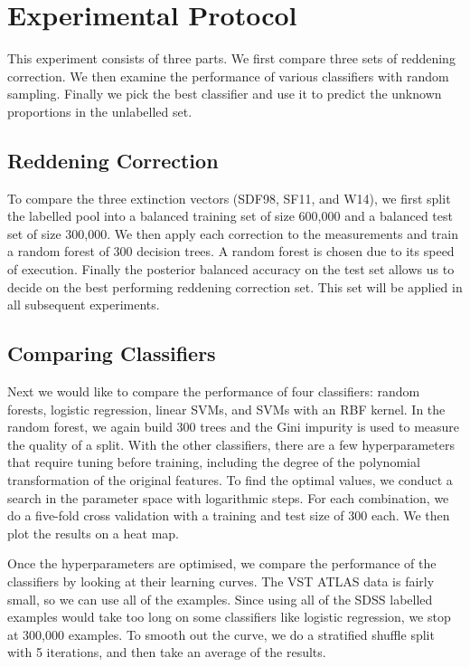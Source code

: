 \section{Experimental Protocol}
\label{sec:protocol1}

This experiment consists of three parts. We first compare three sets of reddening correction.
We then examine the performance of various classifiers with random sampling. Finally
we pick the best classifier and use it to predict the unknown proportions in the unlabelled
set.

\subsection{Reddening Correction}
\label{sub:red}

To compare the three extinction vectors (SDF98, SF11, and W14), we first split the labelled pool
into a balanced training set of size 600,000 and a balanced test set of size 300,000. We then apply
each correction to the measurements and train a random forest of 300 decision trees. A random
forest is chosen due to its speed of execution. Finally the posterior balanced accuracy on the test
set allows us to decide on the best performing reddening correction set. This set will be applied
in all subsequent experiments.

\subsection{Comparing Classifiers}
\label{sub:compare}

Next we would like to compare the performance of four classifiers: random forests, logistic
regression, linear SVMs, and SVMs with an RBF kernel. In the random forest,
we again build 300 trees and the
Gini impurity is used to measure the quality of a split. With the other classifiers,
there
are a few hyperparameters that require tuning before training, including the degree of the polynomial
transformation of the original features. To find the optimal values,
we conduct a search in the parameter space with logarithmic steps. For each combination,
we do a five-fold cross validation with a training and test size of 300 each. We then plot
the results on a heat map.

Once the hyperparameters are optimised, we compare the performance of the classifiers by looking at
their learning curves. The VST ATLAS data is fairly small, so we can use all of the examples. Since
using all of the SDSS labelled examples would take too long on some classifiers like logistic
regression, we stop at 300,000 examples. To smooth out the curve, we do a stratified shuffle split
with 5 iterations, and then take an average of the results.

